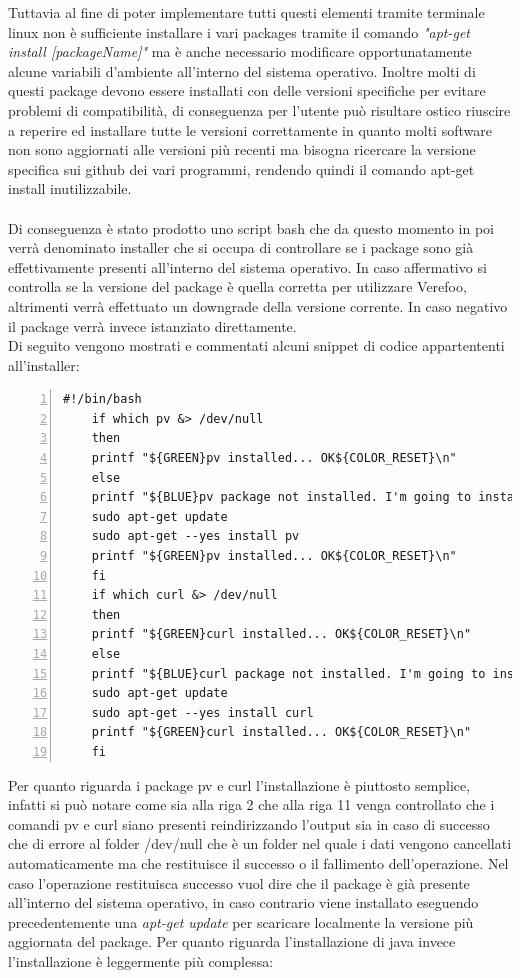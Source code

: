 Tuttavia al fine di poter implementare tutti questi elementi tramite terminale linux non è sufficiente installare i vari packages tramite il comando
\textit{"apt-get install [packageName]"} ma è anche necessario modificare opportunatamente alcune variabili d'ambiente all'interno del sistema operativo. Inoltre molti di questi package devono essere installati con delle versioni specifiche per evitare problemi di compatibilità,
di conseguenza per l'utente può risultare ostico riuscire a reperire ed installare tutte le versioni correttamente in quanto molti software non sono aggiornati alle versioni più recenti ma bisogna ricercare la versione specifica sui github dei vari programmi, rendendo quindi il comando apt-get install inutilizzabile.
\\ \\
Di conseguenza è stato prodotto uno script bash che da questo momento in poi verrà denominato installer che si occupa di controllare se i package sono già effettivamente presenti all'interno del sistema operativo. In caso affermativo si controlla se la versione del package è quella corretta per utilizzare Verefoo, altrimenti verrà
effettuato un downgrade della versione corrente. In caso negativo il package verrà invece istanziato direttamente.
\\Di seguito vengono mostrati e commentati alcuni snippet di codice appartententi all'installer:

\begin{lstlisting}[style=bashstyle, caption={Installazione packages curl e pv}, label=lst:bash-example,numbers=left]
    #!/bin/bash
    if which pv &> /dev/null
    then
    printf "${GREEN}pv installed... OK${COLOR_RESET}\n"
    else
    printf "${BLUE}pv package not installed. I'm going to install it\n${COLOR_RESET}\n"
    sudo apt-get update
    sudo apt-get --yes install pv
    printf "${GREEN}pv installed... OK${COLOR_RESET}\n"
    fi
    if which curl &> /dev/null
    then
    printf "${GREEN}curl installed... OK${COLOR_RESET}\n"
    else
    printf "${BLUE}curl package not installed. I'm going to install it\n${COLOR_RESET}\n"
    sudo apt-get update
    sudo apt-get --yes install curl
    printf "${GREEN}curl installed... OK${COLOR_RESET}\n"
    fi
\end{lstlisting}

Per quanto riguarda i package pv e curl l'installazione è piuttosto semplice, infatti si può notare come sia alla riga 2 che alla riga 11 venga controllato che i comandi pv e curl siano presenti reindirizzando l'output sia in caso di successo che di errore al folder /dev/null che è un folder nel quale i 
dati vengono cancellati automaticamente ma che restituisce il successo o il fallimento dell'operazione. Nel caso l'operazione restituisca successo vuol dire che il package è già presente all'interno del sistema operativo, in caso contrario viene installato eseguendo precedentemente una \textit{apt-get update}
per scaricare localmente la versione più aggiornata del package.
Per quanto riguarda l'installazione di java invece l'installazione è leggermente più complessa:

